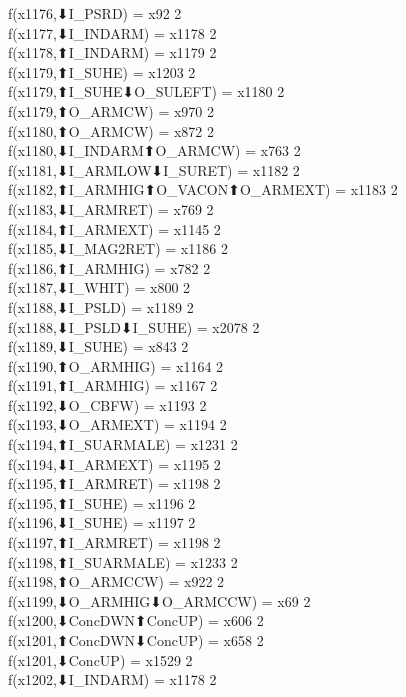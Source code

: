 f(x1176,⬇I_PSRD) = x92 {2} \\
f(x1177,⬇I_INDARM) = x1178 {2} \\
f(x1178,⬆I_INDARM) = x1179 {2} \\
f(x1179,⬆I_SUHE) = x1203 {2} \\
f(x1179,⬆I_SUHE⬇O_SULEFT) = x1180 {2} \\
f(x1179,⬆O_ARMCW) = x970 {2} \\
f(x1180,⬆O_ARMCW) = x872 {2} \\
f(x1180,⬇I_INDARM⬆O_ARMCW) = x763 {2} \\
f(x1181,⬇I_ARMLOW⬇I_SURET) = x1182 {2} \\
f(x1182,⬆I_ARMHIG⬆O_VACON⬆O_ARMEXT) = x1183 {2} \\
f(x1183,⬇I_ARMRET) = x769 {2} \\
f(x1184,⬆I_ARMEXT) = x1145 {2} \\
f(x1185,⬇I_MAG2RET) = x1186 {2} \\
f(x1186,⬆I_ARMHIG) = x782 {2} \\
f(x1187,⬇I_WHIT) = x800 {2} \\
f(x1188,⬇I_PSLD) = x1189 {2} \\
f(x1188,⬇I_PSLD⬇I_SUHE) = x2078 {2} \\
f(x1189,⬇I_SUHE) = x843 {2} \\
f(x1190,⬆O_ARMHIG) = x1164 {2} \\
f(x1191,⬆I_ARMHIG) = x1167 {2} \\
f(x1192,⬇O_CBFW) = x1193 {2} \\
f(x1193,⬇O_ARMEXT) = x1194 {2} \\
f(x1194,⬆I_SUARMALE) = x1231 {2} \\
f(x1194,⬇I_ARMEXT) = x1195 {2} \\
f(x1195,⬆I_ARMRET) = x1198 {2} \\
f(x1195,⬆I_SUHE) = x1196 {2} \\
f(x1196,⬇I_SUHE) = x1197 {2} \\
f(x1197,⬆I_ARMRET) = x1198 {2} \\
f(x1198,⬆I_SUARMALE) = x1233 {2} \\
f(x1198,⬆O_ARMCCW) = x922 {2} \\
f(x1199,⬇O_ARMHIG⬇O_ARMCCW) = x69 {2} \\
f(x1200,⬇ConcDWN⬆ConcUP) = x606 {2} \\
f(x1201,⬆ConcDWN⬇ConcUP) = x658 {2} \\
f(x1201,⬇ConcUP) = x1529 {2} \\
f(x1202,⬇I_INDARM) = x1178 {2} \\
